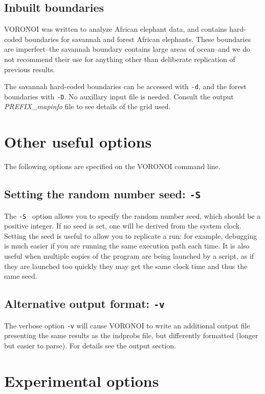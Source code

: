 \documentclass[10pt,titlepage,times,letterpaper]{article}
\begin{document}
\subsection{Inbuilt boundaries}

VORONOI was written to analyze African elephant data, and contains hard-coded
boundaries for savannah and forest African elephants.  These boundaries are 
imperfect--the savannah boundary contains large areas of ocean--and we do not
recommend their use for anything other than deliberate replication of previous results.

The savannah hard-coded boundaries can be accessed with {\tt -d}, and the 
forest boundaries with {\tt -D}.  No auxillary input file is needed.  Consult
the output {\it PREFIX\_mapinfo} file to see details of the grid used.

\section{Other useful options}

The following options are specified on the VORONOI command line.

\subsection{Setting the random number seed:  {\tt -S}}

The {\tt -S } option allows you to specify the random number seed, which should be a
positive integer.  If no seed is set, one will be derived from the system clock.
Setting the seed is useful to allow you to replicate a run:  for example, debugging is
much easier if you are running the same execution path each time.
It is also useful when multiple copies of the program are being launched by a script,
as if they are launched too quickly they may get the same clock time and thus the same seed.

\subsection{Alternative output format:  {\tt -v}}

The verbose option {\tt -v} will cause VORONOI to write an additional output
file presenting the same results as the indprobs file, but differently formatted (longer
but easier to parse).  For details see the output section.

\section{Experimental options}
\end{document}
